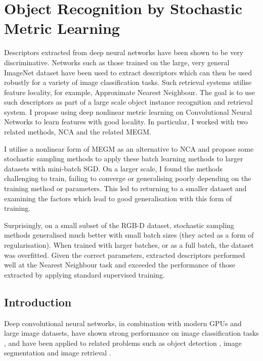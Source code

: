
\chapter{Object Recognition by Stochastic Metric Learning}
\label{chap:metric} 

Descriptors extracted from deep neural networks have been shown to be very discriminative. Networks such as those trained on the large, very general ImageNet dataset have been used to extract descriptors which can then be used robustly for a variety of image classification tasks. Such retrieval systems utilise feature locality, for example, Approximate Nearest Neighbour. The goal is to use such descriptors as part of a large scale object instance recognition and retrieval system. I propose using deep nonlinear metric learning on Convolutional Neural Networks to learn features with good locality. In particular, I worked with two related methods, \gls{NCA} and the related \gls{MEGM}.

I utilise a nonlinear form of \gls{MEGM} as an alternative to \gls{NCA} and propose some stochastic sampling methods to apply these batch learning methods to larger datasets with mini-batch \gls{SGD}. On a larger scale, I found the methods challenging to train, failing to converge or generalising poorly depending on the training method or parameters. This led to returning to a smaller dataset and examining the factors which lead to good generalisation with this form of training.
  
Surprisingly, on a small subset of the RGB-D dataset, stochastic sampling methods generalised much better with small batch sizes (they acted as a form of regularisation). When trained with larger batches, or as a full batch, the dataset was overfitted. Given the correct parameters, extracted descriptors performed well at the Nearest Neighbour task and exceeded the performance of those extracted by applying standard supervised training.

\section{Introduction}

Deep convolutional neural networks, in combination with modern \gls{GPU}s and large image datasets, have shown strong performance on image classification tasks \cite {Krizhevsky2012}, and have been applied to related problems such as object detection \cite{Sermanet2013}, image segmentation \cite{Masci2013} and image retrieval \cite{Razavian2014}.

